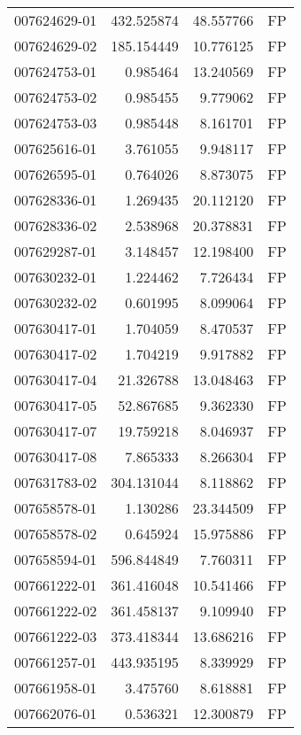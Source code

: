 \begin{tabular}{lrrl}
007624629-01 &  432.525874 &      48.557766 &   FP \\
007624629-02 &  185.154449 &      10.776125 &   FP \\
007624753-01 &    0.985464 &      13.240569 &   FP \\
007624753-02 &    0.985455 &       9.779062 &   FP \\
007624753-03 &    0.985448 &       8.161701 &   FP \\
007625616-01 &    3.761055 &       9.948117 &   FP \\
007626595-01 &    0.764026 &       8.873075 &   FP \\
007628336-01 &    1.269435 &      20.112120 &   FP \\
007628336-02 &    2.538968 &      20.378831 &   FP \\
007629287-01 &    3.148457 &      12.198400 &   FP \\
007630232-01 &    1.224462 &       7.726434 &   FP \\
007630232-02 &    0.601995 &       8.099064 &   FP \\
007630417-01 &    1.704059 &       8.470537 &   FP \\
007630417-02 &    1.704219 &       9.917882 &   FP \\
007630417-04 &   21.326788 &      13.048463 &   FP \\
007630417-05 &   52.867685 &       9.362330 &   FP \\
007630417-07 &   19.759218 &       8.046937 &   FP \\
007630417-08 &    7.865333 &       8.266304 &   FP \\
007631783-02 &  304.131044 &       8.118862 &   FP \\
007658578-01 &    1.130286 &      23.344509 &   FP \\
007658578-02 &    0.645924 &      15.975886 &   FP \\
007658594-01 &  596.844849 &       7.760311 &   FP \\
007661222-01 &  361.416048 &      10.541466 &   FP \\
007661222-02 &  361.458137 &       9.109940 &   FP \\
007661222-03 &  373.418344 &      13.686216 &   FP \\
007661257-01 &  443.935195 &       8.339929 &   FP \\
007661958-01 &    3.475760 &       8.618881 &   FP \\
007662076-01 &    0.536321 &      12.300879 &   FP \\

\end{tabular}
